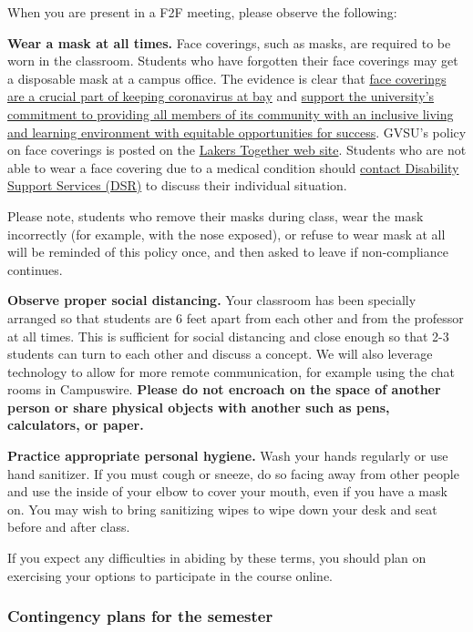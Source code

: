 \documentclass[]{article}
\begin{document}
When you are present in a F2F meeting, please observe the following:

\textbf{Wear a mask at all times.} Face coverings, such as masks, are
required to be worn in the classroom. Students who have forgotten their
face coverings may get a disposable mask at a campus office. The
evidence is clear that
\href{https://www.wbtv.com/2020/06/29/demonstration-aims-show-effectiveness-masks/}{face
coverings are a crucial part of keeping coronavirus at bay} and
\href{https://www.gvsu.edu/inclusion/suggested-syllabus-language-for-inclusion-and-equity-132.htm}{support
the university's commitment to providing all members of its community
with an inclusive living and learning environment with equitable
opportunities for success}. GVSU's policy on face coverings is posted on
the
\href{https://www.gvsu.edu/lakerstogether/face-covering-policy-27.htm}{Lakers
Together web site}. Students who are not able to wear a face covering
due to a medical condition should
\href{https://www.gvsu.edu/dsr/}{contact Disability Support Services
(DSR)} to discuss their individual situation.

Please note, students who remove their masks during class, wear the mask
incorrectly (for example, with the nose exposed), or refuse to wear mask
at all will be reminded of this policy once, and then asked to leave if
non-compliance continues.

\textbf{Observe proper social distancing.} Your classroom has been
specially arranged so that students are 6 feet apart from each other and
from the professor at all times. This is sufficient for social
distancing and close enough so that 2-3 students can turn to each other
and discuss a concept. We will also leverage technology to allow for
more remote communication, for example using the chat rooms in
Campuswire. \textbf{Please do not encroach on the space of another
person or share physical objects with another such as pens, calculators,
or paper.}

\textbf{Practice appropriate personal hygiene.} Wash your hands
regularly or use hand sanitizer. If you must cough or sneeze, do so
facing away from other people and use the inside of your elbow to cover
your mouth, even if you have a mask on. You may wish to bring sanitizing
wipes to wipe down your desk and seat before and after class.

If you expect any difficulties in abiding by these terms, you should
plan on exercising your options to participate in the course online.

\hypertarget{contingency-plans-for-the-semester}{%
\subsubsection{Contingency plans for the
semester}\label{contingency-plans-for-the-semester}}
\end{document}
